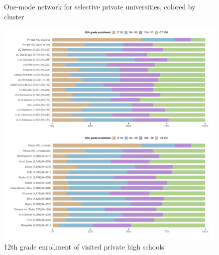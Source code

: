 \documentclass[
  12pt,
]{article}
\begin{document}
\begin{landscape}
\begin{figure}
{}

\caption{One-mode network for selective private universities, colored by cluster}\label{fig:plot-1mode-privu}
\end{figure}

\newpage


\begin{figure}

{\centering \includegraphics[width=2\linewidth]{../assets/figures/ego_network_enroll_pubu_privu} 

}

\caption{12th grade enrollment of visited private high schools}\label{fig:enroll-pubu-privu}
\end{figure}

\newpage

\begin{figure}


\end{figure}
\end{landscape}
\end{document}
